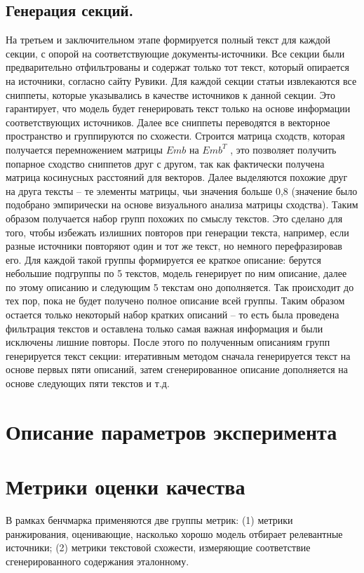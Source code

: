 \documentclass{article}
\theoremstyle{definition}
\theoremstyle{plain}
\begin{document}
\subsection*{Генерация секций.}
На третьем и заключительном этапе формируется полный текст для каждой секции, с опорой на соответствующие документы-источники.
Все секции были предварительно отфильтрованы и содержат только тот текст, который опирается на источники, согласно сайту Рувики. 
Для каждой секции статьи извлекаются все сниппеты, которые указывались в качестве источников к данной секции. 
Это гарантирует, что модель будет генерировать текст только на основе информации соответствующих источников. 
Далее все сниппеты переводятся в векторное пространство и группируются по схожести. Строится матрица сходств, которая получается перемножением матрицы $ Emb $ на $ Emb^T $
, это позволяет получить попарное сходство сниппетов друг с другом, так как фактически получена матрица косинусных расстояний для векторов. 
Далее выделяются похожие друг на друга тексты – те элементы матрицы, чьи значения больше 0,8 (значение было подобрано эмпирически на основе визуального анализа матрицы сходства). 
Таким образом получается набор групп похожих по смыслу текстов. Это сделано для того, чтобы избежать излишних повторов при генерации текста, например, если разные источники повторяют один и тот же текст, но немного перефразировав его. 
Для каждой такой группы формируется ее краткое описание: берутся небольшие подгруппы по 5 текстов, модель генерирует по ним описание, далее по этому описанию и следующим 5 текстам оно дополняется. Так происходит до тех пор, пока не будет получено полное описание всей группы. 
Таким образом остается только некоторый набор кратких описаний – то есть была проведена фильтрация текстов и оставлена только самая важная информация и были исключены лишние повторы. После этого по полученным описаниям групп генерируется текст секции: итеративным методом сначала генерируется текст на основе первых пяти описаний, затем сгенерированное описание дополняется на основе следующих пяти текстов и т.д.
\section*{Описание параметров эксперимента}

\section*{Метрики оценки качества}

В рамках бенчмарка применяются две группы метрик:  
(1) метрики ранжирования, оценивающие, насколько хорошо модель отбирает релевантные источники;  
(2) метрики текстовой схожести, измеряющие соответствие сгенерированного содержания эталонному.
\end{document}
